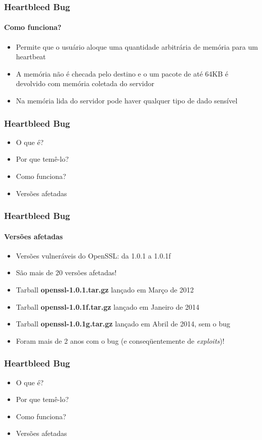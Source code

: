 \documentclass{beamer}
\begin{document}
\begin{frame}
	\frametitle{Heartbleed Bug}
	\framesubtitle{Como funciona?}
	\begin{itemize}
		\item Permite que o usuário aloque uma quantidade arbitrária de memória para um heartbeat
		\item A memória não é checada pelo destino e o um pacote de até 64KB é devolvido com memória coletada do servidor
		\item Na memória lida do servidor pode haver qualquer tipo de dado sensível
	\end{itemize}
\end{frame}

\begin{frame}
	\frametitle{Heartbleed Bug}
	\begin{itemize}
		\item \textcolor{covered}{O que é?}
		\item \textcolor{covered}{Por que temê-lo?}
		\item \textcolor{covered}{Como funciona?}
		\item Versões afetadas
	\end{itemize}
\end{frame}

\begin{frame}
	\frametitle{Heartbleed Bug}
	\framesubtitle{Versões afetadas}
	\begin{itemize}
		\item Versões vulneráveis do OpenSSL: da 1.0.1 a 1.0.1f
		\item São mais de 20 versões afetadas!
		\item Tarball \textbf{\textcolor{filecolor}{openssl-1.0.1.tar.gz}} lançado em Março de 2012
		\item Tarball \textbf{\textcolor{filecolor}{openssl-1.0.1f.tar.gz}} lançado em Janeiro de 2014
		\item Tarball \textbf{\textcolor{filecolor}{openssl-1.0.1g.tar.gz}} lançado em Abril de 2014, sem o bug
		\item Foram mais de 2 anos com o bug (e conseqüentemente de \textit{exploits})!
	\end{itemize}
\end{frame}

\begin{frame}
	\frametitle{Heartbleed Bug}
	\begin{itemize}
		\item \textcolor{covered}{O que é?}
		\item \textcolor{covered}{Por que temê-lo?}
		\item \textcolor{covered}{Como funciona?}
		\item \textcolor{covered}{Versões afetadas}
	\end{itemize}
\end{frame}
\end{document}
